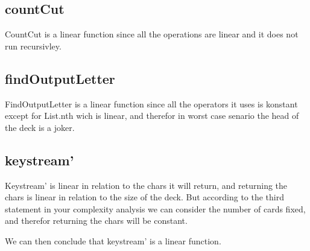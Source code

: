 \documentclass[12pt, a4paper]{article}
\begin{document}
\subsection{countCut}
CountCut is a linear function since all the operations are linear and it does not run recursivley.

\subsection{findOutputLetter}
FindOutputLetter is a linear function since all the operators it uses is konstant except for List.nth wich is linear, and therefor in worst case senario the head of the deck is a joker.

\subsection{keystream'}
Keystream' is linear in relation to the chars it will return, and returning the chars is linear in relation to the size of the deck. But according to the third statement in your complexity analysis we can consider the number of cards fixed, and therefor returning the chars will be constant. 

We can then conclude that keystream' is a linear function.
\end{document}
